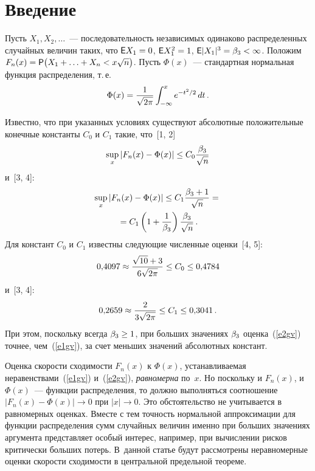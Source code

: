       \begin{multicols}{2}
      
            \label{st\stat}

\section{Введение}

Пусть $X_1,X_2,\ldots$~--- последовательность независимых одинаково
распределенных случайных величин таких, что ${\sf E}X_1=0$, ${\sf
E}X_1^2=1$, ${\sf E}|X_1|^{3}=\beta_{3}<\infty$. Положим $F_n(x)={\sf
P}\big(X_1+\ldots+X_n<x \sqrt{n}\big)$. Пусть $\Phi(x)$~--- стандартная нормальная функция распределения, т.\,е.\
$$
\Phi(x) = \displaystyle\frac{\displaystyle 1\mathstrut}{\displaystyle \sqrt{2\pi}\mathstrut}\int_{-\infty}^x e^{-t^2/2}\,dt\,.
$$

Известно, что при указанных условиях существуют абсолютные
положительные конечные константы $C_0$ и $C_1$ такие, что~[1, 2]
\begin{equation}
\sup_x|F_n (x)-\Phi(x)|\le C_0 \displaystyle\frac{\displaystyle \beta_{3}\mathstrut}{\displaystyle \sqrt{n}\mathstrut}
\label{e1gv}
\end{equation}
 и~[3, 4]:
\begin{multline}
\sup_x\left|F_n(x)-\Phi(x)\right|\le C_1\displaystyle\frac{\displaystyle \beta_{3}+1\mathstrut}{\displaystyle \sqrt{n}\mathstrut}={}\\
{}=
C_1\left(1+\displaystyle\frac{\displaystyle 1\mathstrut}{\displaystyle \beta_{3}\mathstrut}\right)\displaystyle\frac{\displaystyle \beta_{3}\mathstrut}{\displaystyle \sqrt{n}\mathstrut}\label{e2gv}\,.
\end{multline}
 Для констант $C_0$ и $C_1$ известны следующие численные
оценки~[4, 5]:
\begin{equation*}
0{,}4097\approx\displaystyle\frac{\displaystyle \sqrt{10}+3\mathstrut}{\displaystyle 6\sqrt{2\pi}\mathstrut}\le C_0\le
0{,}4784
\end{equation*}
и~[3, 4]:
\begin{equation*}
0{,}2659\approx\displaystyle\frac{\displaystyle 2\mathstrut}{\displaystyle 3\sqrt{2\pi}\mathstrut}\le C_1\le 0{,}3041\,.
\end{equation*}
При этом, поскольку всегда $\beta_{3}\ge1$, при больших значениях
$\beta_{3}$ оценка~(\ref{e2gv}) точнее, чем~(\ref{e1gv}), за счет меньших значений
абсолютных констант.

Оценка скорости сходимости $F_n(x)$ к $\Phi(x)$,
устанавливаемая неравенствами~(\ref{e1gv}) и~(\ref{e2gv}), \textit{равномерна} по~$x$.
Но поскольку и $F_n(x)$, и $\Phi(x)$~--- функции распределения, то
должно выполняться соотношение $|F_n(x)-\Phi(x)|\rightarrow 0$ при
$|x|\to0$. Это обстоятельство не учитывается в равномерных
оценках. Вместе с тем точность нормальной аппроксимации для
функции распределения сумм случайных величин именно при больших
значениях аргумента представляет особый интерес, например, при
вычислении рисков критически больших потерь. В~данной статье будут
рассмотрены неравномерные оценки скорости сходимости в центральной
предельной теореме.


\end{multicols}
